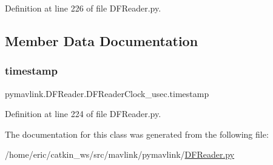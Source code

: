 Definition at line 226 of file D\+F\+Reader.\+py.



\subsection{Member Data Documentation}
\mbox{\label{classpymavlink_1_1DFReader_1_1DFReaderClock__usec_a795cbd1e1eb2d5efc767ba1fa4abeab5}} 
\subsubsection{\texorpdfstring{timestamp}{timestamp}}
{\footnotesize\ttfamily pymavlink.\+D\+F\+Reader.\+D\+F\+Reader\+Clock\+\_\+usec.\+timestamp}



Definition at line 224 of file D\+F\+Reader.\+py.



The documentation for this class was generated from the following file\+:\begin{DoxyCompactItemize}
\item 
/home/eric/catkin\+\_\+ws/src/mavlink/pymavlink/\mbox{\hyperlink{DFReader_8py}{D\+F\+Reader.\+py}}\end{DoxyCompactItemize}
